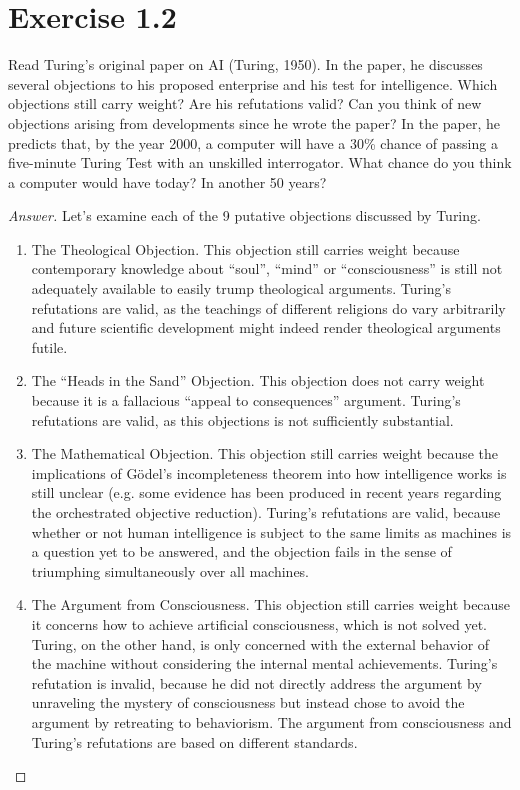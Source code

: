 \documentclass{amsbook}
\theoremstyle{definition}
\theoremstyle{remark}
\numberwithin{section}{chapter}
\numberwithin{equation}{chapter}
\begin{document}
\section{Exercise 1.2}
Read Turing's original paper on AI (Turing, 1950). In the paper, he discusses several objections to his proposed enterprise and his test for intelligence. Which objections still carry weight? Are his refutations valid? Can you think of new objections arising from developments since he wrote the paper? In the paper, he predicts that, by the year 2000, a computer will have a 30\% chance of passing a five-minute Turing Test with an unskilled interrogator. What chance do you think a computer would have today? In another 50 years?
\begin{proof}[Answer]
Let's examine each of the 9 putative objections discussed by Turing.
\begin{enumerate}
\item The Theological Objection. This objection still carries weight because contemporary knowledge about ``soul'', ``mind'' or ``consciousness'' is still not adequately available to easily trump theological arguments. Turing's refutations are valid, as the teachings of different religions do vary arbitrarily and future scientific development might indeed render theological arguments futile.
\item The ``Heads in the Sand'' Objection. This objection does not carry weight because it is a fallacious ``appeal to consequences'' argument. Turing's refutations are valid, as this objections is not sufficiently substantial.
\item The Mathematical Objection. This objection still carries weight because the implications of Gödel's incompleteness theorem into how intelligence works is still unclear (e.g. some evidence has been produced in recent years regarding the orchestrated objective reduction). Turing's refutations are valid, because whether or not human intelligence is subject to the same limits as machines is a question yet to be answered, and the objection fails in the sense of triumphing simultaneously over all machines.
\item The Argument from Consciousness. This objection still carries weight because it concerns how to achieve artificial consciousness, which is not solved yet. Turing, on the other hand, is only concerned with the external behavior of the machine without considering the internal mental achievements. Turing's refutation is invalid, because he did not directly address the argument by unraveling the mystery of consciousness but instead chose to avoid the argument by retreating to behaviorism. The argument from consciousness and Turing's refutations are based on different standards.

\end{enumerate}
\end{proof}
\end{document}
